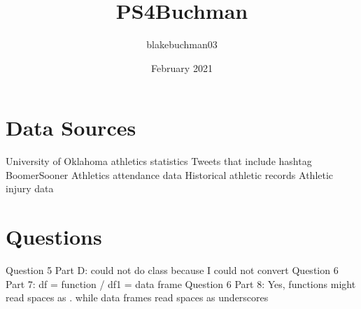 \documentclass{article}
\title{PS4Buchman}
\author{blakebuchman03 }
\date{February 2021}
\begin{document}
\maketitle

\section{Data Sources}
University of Oklahoma athletics statistics
\newline Tweets that include hashtag BoomerSooner
\newline Athletics attendance data
\newline Historical athletic records
\newline Athletic injury data
\section{Questions}
Question 5 Part D: could not do class because I could not convert
\newline Question 6 Part 7: df = function / df1 = data frame
\newline Question 6 Part 8: Yes, functions might read spaces as . while data frames read spaces as underscores 
\end{document}
